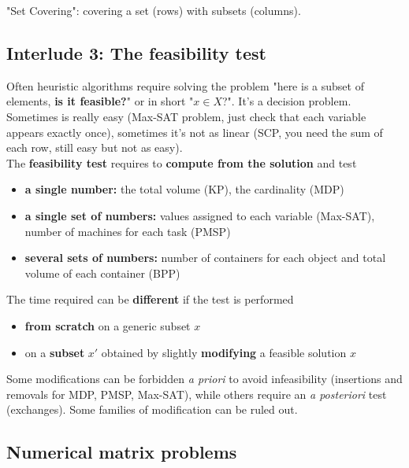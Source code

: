 \documentclass[11pt]{article}
\begin{document}
	"Set Covering": covering a set (rows) with subsets (columns).\\
	
	\newpage
	
	\subsection*{Interlude 3: The feasibility test}
	Often heuristic algorithms require solving the problem "here is a subset of elements, \textbf{is it feasible?}" or in short "$x \in X$?". It's a decision problem.\\
	
	Sometimes is really easy (Max-SAT problem, just check that each variable appears exactly once), sometimes it's not as linear (SCP, you need the sum of each row, still easy but not as easy).\\
	
	The \textbf{feasibility test} requires to \textbf{compute from the solution} and test
	\begin{itemize}
		\item \textbf{a single number:} the total volume (KP), the cardinality (MDP)
		\item \textbf{a single set of numbers:} values assigned to each variable (Max-SAT), number of machines for each task (PMSP)
		\item \textbf{several sets of numbers:} number of containers for each object and total volume of each container (BPP)
	\end{itemize}
	\nn
	
	The time required can be \textbf{different} if the test is performed
	\begin{itemize}
		\item \textbf{from scratch} on a generic subset $x$
		\item on a \textbf{subset} $x'$ obtained by slightly \textbf{modifying} a feasible solution $x$
	\end{itemize}
	\nn
	
	Some modifications can be forbidden \textit{a priori} to avoid infeasibility (insertions and removals for MDP, PMSP, Max-SAT), while others require an \textit{a posteriori} test (exchanges). Some families of modification can be ruled out.\\
	
	
	\newpage
	
	\subsection{Numerical matrix problems}
\end{document}

